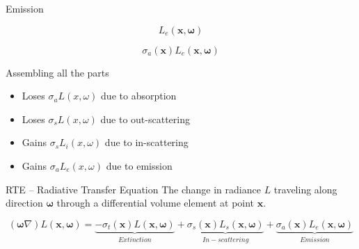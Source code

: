 \documentclass[
  english,            %
  aspectratio=169,    %
]{tumbeamer}
\newcommand\bx[0]{\bm{x}}
\newcommand\bomega[0]{\bm{\omega}}
\begin{document}
\begin{frame}{Emission}
\begin{figure}[ht]
    \centering
        
\end{figure}
$$L_e(\bx, \bomega)$$

$$\sigma_a(\boldsymbol{x})L_e(\bx, \bomega)$$
\end{frame}

\begin{frame}{Assembling all the parts}
    \begin{figure}[ht]
        \centering
        
        \label{fig:interactions}
    \end{figure}
    \begin{itemize}
        \item Loses $\sigma_a L(x, \omega)$ due to absorption
        \item Loses $\sigma_s L(x, \omega)$ due to out-scattering
        \item Gains $\sigma_s L_i(x, \omega)$ due to in-scattering
        \item Gains $\sigma_a L_e(x, \omega)$ due to emission
    \end{itemize}
\end{frame}


\begin{frame}{RTE -- Radiative Transfer Equation}
    The change in radiance $L$ traveling along direction $\boldsymbol{\omega}$
    through a differential volume element at point $\boldsymbol{x}$.
    \begin{figure}[ht]
        \centering
        \scalebox{.7}{
            
        }
    \end{figure}
    \begin{equation} 
        \label{eq:RTE}
        (\bomega \nabla)L(\bx,\bomega) =
        \underbrace{ - \sigma_t(\bx)L(\bx,\bomega)}
        _{Extinction}
        + 
        \underbrace{\sigma_s(\bx)L_s(\bx,\bomega)}
        _{In-scattering}
        + 
        \underbrace{\sigma_a(\bx)L_e(\bx,\bomega)}
        _{Emission}
    \end{equation}
\end{frame}
\end{document}
